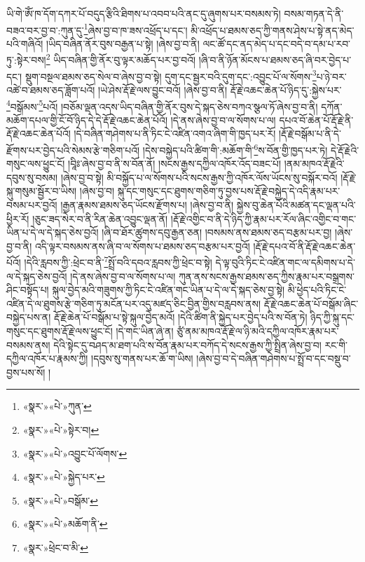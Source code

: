 ཡི་གེ་ཨོཾ་ཁ་དོག་དཀར་པོ་བདུད་རྩིའི་ཐིགས་པ་འབབ་པའི་ནང་དུ་ཞུགས་པར་བསམས་ཏེ། བསམ་གཏན་དེ་ནི་བཟའ་བར་བྱ་བ་:ཀུན་དུ་\footnote{«སྣར་»«པེ་»ཀུན་}ཞེས་བྱ་བ་ཁ་ཟས་འཕྲོད་པ་དང་། མི་འཕྲོད་པ་ཐམས་ཅད་ཀྱི་གནས་ཤེས་པ་སྟེ་ནད་མེད་པའི་གཞིའོ། །ཡིད་བཞིན་ནོར་བུས་བརྒྱན་པ་སྟེ། །ཞེས་བྱ་བ་ནི། ལང་ཚོ་དང་ནད་མེད་པ་དང་བདེ་བ་དམ་པ་རབ་ཏུ་:སྟེར་བས།\footnote{«སྣར་»«པེ་»སྟེར་བ།} ཡིད་བཞིན་གྱི་ནོར་བུ་ལྟར་མཆོད་པར་བྱ་བའོ། །ཞི་བ་ནི་ཉོན་མོངས་པ་ཐམས་ཅད་ཞི་བར་བྱེད་པ་དང་། སྡུག་བསྔལ་ཐམས་ཅད་སེལ་བ་ཞེས་བྱ་བ་སྟེ། དུག་དང་སྦྱར་བའི་དུག་དང་:འབྱུང་པོ་ལ་སོགས་\footnote{«སྣར་»«པེ་»འབྱུང་པོ་ལོགས་}པ་ཉེ་བར་འཚེ་བ་ཐམས་ཅད་ཟློག་པའོ། །ཡེ་ཤེས་རྡོ་རྗེ་ལས་བྱུང་བའོ། །ཞེས་བྱ་བ་ནི། རྡོ་རྗེ་འཆང་ཆེན་པོ་ཉིད་དུ་:སྐྱེས་པར་\footnote{«སྣར་»«པེ་»སྐྱེད་པར་}བསྒོམས་\footnote{«སྣར་»«པེ་»བསྒོམ་}པའོ། །བཅོམ་ལྡན་འདས་ཡིད་བཞིན་གྱི་ནོར་བུས་དེ་སྐད་ཅེས་བཀའ་སྩལ་ཏོ་ཞེས་བྱ་བ་ནི། དཀོན་མཆོག་དཔལ་གྱི་ངོ་བོ་ཉིད་དེ་དེ་རྡོ་རྗེ་འཆང་ཆེན་པོའོ། །དེ་ནས་ཞེས་བྱ་བ་ལ་སོགས་པ་ལ། དཔའ་བོ་ཆེན་པོ་རྡོ་རྗེ་ནི་རྡོ་རྗེ་འཆང་ཆེན་པོའོ། །དེ་བཞིན་གཤེགས་པ་ནི་ཏིང་ངེ་འཛིན་འགའ་ཞིག་གི་ཁྱད་པར་རོ། །རྡོ་རྗེ་བསྒོམ་པ་ནི་དེ་རྫོགས་པར་བྱེད་པའི་སེམས་རྩེ་གཅིག་པའོ། །དེས་བསྐྱེད་པའི་ཚིག་གི་:མཆོག་གི་\footnote{«སྣར་»«པེ་»མཆོག་ནི་}ས་བོན་གྱི་ཁྱད་པར་ཏེ། དེ་རྡོ་རྗེའི་གསུང་ལས་ཕྱུང་ངོ། །བཱིཿ་ཞེས་བྱ་བ་ནི་ས་བོན་ནོ། །སངས་རྒྱས་དཀྱིལ་འཁོར་འོད་བཟང་པོ། །ནམ་མཁའ་རྡོ་རྗེའི་དབུས་སུ་བསམ། །ཞེས་བྱ་བ་སྟེ། མི་བསྐྱོད་པ་ལ་སོགས་པའི་སངས་རྒྱས་ཀྱི་འཁོར་ལོས་ཡོངས་སུ་བསྐོར་བའོ། །རྡོ་རྗེ་སྐུ་གསུམ་སྦྱོར་བ་ཡིས། །ཞེས་བྱ་བ། སྐུ་དང་གསུང་དང་ཐུགས་གཅིག་ཏུ་བྱས་པས་རྡོ་རྗེ་བསྐྱེད་དེ་འདི་རྣམ་པར་བསམ་པར་བྱའོ། །རྒྱན་རྣམས་ཐམས་ཅད་ཡོངས་རྫོགས་པ། །ཞེས་བྱ་བ་ནི། སྐྱེས་བུ་ཆེན་པོའི་མཚན་དང་ལྡན་པའི་ཕྱིར་རོ། །ཅུང་ཟད་སེར་བ་ནི་རིན་ཆེན་འབྱུང་ལྡན་ནོ། །རྡོ་རྗེ་འགྱིང་བ་ནི་དེ་ཉིད་ཀྱི་རྣམ་པར་རོལ་ཞིང་འགྱིང་བ་གང་ཡིན་པ་དེ་ལ་དེ་སྐད་ཅེས་བྱའོ། །ཞི་བ་ཐོར་ཚུགས་དབུ་རྒྱན་ཅན། །བསམས་ནས་ཐམས་ཅད་བརྩམ་པར་བྱ། །ཞེས་བྱ་བ་ནི། འདི་ལྟར་བསམས་ནས་ཞི་བ་ལ་སོགས་པ་ཐམས་ཅད་བརྩམ་པར་བྱའོ། །རྡོ་རྗེ་དཔའ་བོ་ནི་རྡོ་རྗེ་འཆང་ཆེན་པོའོ། །དེའི་རླབས་ཀྱི་:ཕྲེང་བ་ནི་\footnote{«སྣར་»ཕྲེང་བ་མི་}སྤྲོ་བའི་དབའ་རླབས་ཀྱི་ཕྲེང་བ་སྟེ། དེ་ལྟ་བུའི་ཏིང་ངེ་འཛིན་གང་ལ་དམིགས་པ་དེ་ལ་དེ་སྐད་ཅེས་བྱའོ། །དེ་ནས་ཞེས་བྱ་བ་ལ་སོགས་པ་ལ། ཀུན་ནས་སངས་རྒྱས་ཐམས་ཅད་ཀྱིས་རྣམ་པར་བསྒྲགས་ཤིང་བསྟོད་པ། སྐུལ་བྱེད་མའི་གཟུགས་ཀྱི་ཏིང་ངེ་འཛིན་གང་ཡིན་པ་དེ་ལ་དེ་སྐད་ཅེས་བྱ་སྟེ། མི་ཕྱེད་པའི་ཏིང་ངེ་འཛིན་དེ་ལ་ཐུགས་རྩེ་གཅིག་ཏུ་མངོན་པར་འདུ་མཛད་ཅིང་བྱིན་གྱིས་བརླབས་ནས། རྡོ་རྗེ་འཆང་ཆེན་པོ་བསྒོམ་ཞིང་བསྐྱེད་པས་ན། རྡོ་རྗེ་ཆེན་པོ་བསྒོམ་པ་སྟེ་སྐུལ་བྱེད་མའོ། །དེའི་ཚིག་ནི་སྐྱེད་པར་བྱེད་པའི་ས་བོན་ཏེ། ཉིད་ཀྱི་སྐུ་དང་གསུང་དང་ཐུགས་རྡོ་རྗེ་ལས་ཕྱུང་ངོ། །དེ་གང་ཡིན་ཞེ་ན། ཙུཾ་ནམ་མཁའ་རྡོ་རྗེ་ལ་ཉི་མའི་དཀྱིལ་འཁོར་རྣམ་པར་བསམས་ནས། དེའི་སྟེང་དུ་བཤད་མ་ཐག་པའི་ས་བོན་རྣམ་པར་བཀོད་དེ་སངས་རྒྱས་ཀྱི་སྤྲིན་ཞེས་བྱ་བ། རང་གི་དཀྱིལ་འཁོར་པ་རྣམས་ཀྱི། །དབུས་སུ་གནས་པར་ཆོ་ག་ཡིས། །ཞེས་བྱ་བ་དེ་བཞིན་གཤེགས་པ་སྤྲོ་བ་དང་བསྡུ་བ་བྱས་པས་སོ། །
